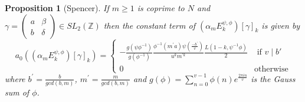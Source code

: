 \documentclass{amsart}
\theoremstyle{plain}
\newtheorem{propn}[theorem]{Proposition}
\theoremstyle{definition}
\newcommand*{\field}[1]{\mathbb{#1}}
\begin{document}
\begin{propn}[Spencer]
\label{prop:spencer}
If $m \geq 1$ is coprime to $N$ and $\gamma = \left(\begin{smallmatrix} a & \beta \\ b & \delta \end{smallmatrix}\right) \in SL_2(\field{Z})$ then the constant term of $(\alpha_mE_k^{\psi,\phi})[\gamma]_k$ is given by
\begin{equation*}
    a_0((\alpha_m E_k^{\psi,\phi})[\gamma]_k) = \begin{cases}
    -\frac{g(\psi\phi^{-1})}{g(\phi^{-1})}\frac{\phi^{-1}(m^\prime a) \psi\left(\frac{-b^\prime}{v}\right)}{u^k m^{\prime k}}\frac{L(1-k, \psi^{-1}\phi)}{2} & \text{ if }v\mid b'\\ 0 & \text{otherwise}
    \end{cases}
\end{equation*}
where $b^\prime = \frac{b}{gcd(b,m)}$, $m^\prime=\frac{m}{gcd(b,m)}$ and $g(\phi)=\sum_{n=0}^{v-1}\phi(n)e^{\frac{2\pi i n}{v}}$ is the Gauss sum of $\phi$. 
\end{propn}
\end{document}
